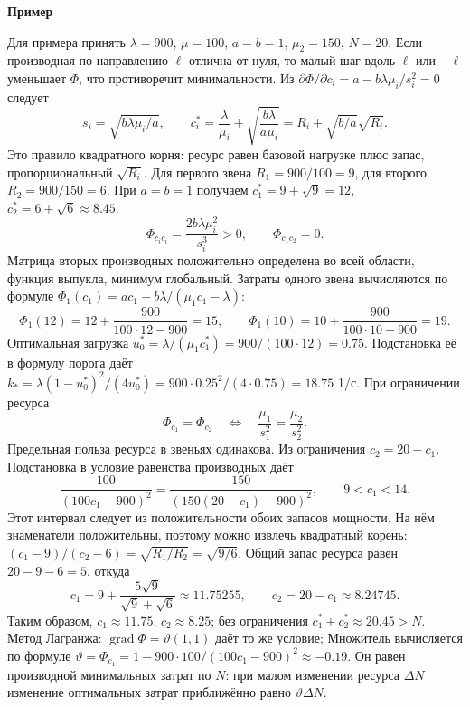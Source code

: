 \documentclass[12pt,a4paper]{article}
\newcommand{\taskhead}[1]{\par\textbf{#1}\par}
\begin{document}
\taskhead{Пример}
Для примера принять $\lambda=900$, $\mu=100$, $a=b=1$, $\mu_2=150$, $N=20$.
Если производная по направлению $\ell$ отлична от нуля, то малый шаг вдоль
$\ell$ или $-\ell$ уменьшает $\Phi$, что противоречит минимальности.
Из $\partial\Phi/\partial c_i=a-b\lambda\mu_i/s_i^2=0$ следует
\[
s_i=\sqrt{b\lambda\mu_i/a},\qquad
c_i^*=\frac\lambda{\mu_i}+\sqrt{\frac{b\lambda}{a\mu_i}}
=R_i+\sqrt{b/a}\sqrt{R_i}.
\]
Это правило квадратного корня: ресурс равен базовой нагрузке плюс запас,
пропорциональный $\sqrt{R_i}$.
Для первого звена $R_1=900/100=9$, для второго $R_2=900/150=6$.
При $a=b=1$ получаем $c_1^*=9+\sqrt9=12$,
$c_2^*=6+\sqrt6\approx8.45$.
\[
\Phi_{c_ic_i}=\frac{2b\lambda\mu_i^2}{s_i^3}>0,\qquad \Phi_{c_1c_2}=0.
\]
Матрица вторых производных положительно определена во всей области,
функция выпукла, минимум глобальный.
Затраты одного звена вычисляются по формуле
$\Phi_1(c_1)=ac_1+b\lambda/(\mu_1c_1-\lambda)$:
\[
\Phi_1(12)=12+\frac{900}{100\cdot12-900}=15,\qquad
\Phi_1(10)=10+\frac{900}{100\cdot10-900}=19.
\]
Оптимальная загрузка $u_0^*=\lambda/(\mu_1c_1^*)=900/(100\cdot12)=0.75$.
Подстановка её в формулу порога даёт
$k_*=\lambda(1-u_0^*)^2/(4u_0^*)=900\cdot0.25^2/(4\cdot0.75)=18.75$ 1/с.
При ограничении ресурса
\[
\Phi_{c_1}=\Phi_{c_2}\quad\Longleftrightarrow\quad
\frac{\mu_1}{s_1^2}=\frac{\mu_2}{s_2^2}.
\]
Предельная польза ресурса в звеньях одинакова.
Из ограничения $c_2=20-c_1$. Подстановка в условие равенства производных даёт
\[
\frac{100}{(100c_1-900)^2}
=\frac{150}{(150(20-c_1)-900)^2},\qquad 9<c_1<14.
\]
Этот интервал следует из положительности обоих запасов мощности.
На нём знаменатели положительны, поэтому можно извлечь квадратный корень:
$(c_1-9)/(c_2-6)=\sqrt{R_1/R_2}=\sqrt{9/6}$.
Общий запас ресурса равен $20-9-6=5$, откуда
\[
c_1=9+\frac{5\sqrt9}{\sqrt9+\sqrt6}\approx11.75255,\qquad
c_2=20-c_1\approx8.24745.
\]
Таким образом, $c_1\approx11.75$, $c_2\approx8.25$;
без ограничения $c_1^*+c_2^*\approx20.45>N$.
Метод Лагранжа: $\operatorname{grad}\Phi=\vartheta(1,1)$ даёт то же условие;
Множитель вычисляется по формуле
$\vartheta=\Phi_{c_1}=1-900\cdot100/(100c_1-900)^2\approx-0.19$.
Он равен производной минимальных затрат по $N$:
при малом изменении ресурса $\Delta N$ изменение оптимальных затрат
приближённо равно $\vartheta\Delta N$.


\newpage
\end{document}

